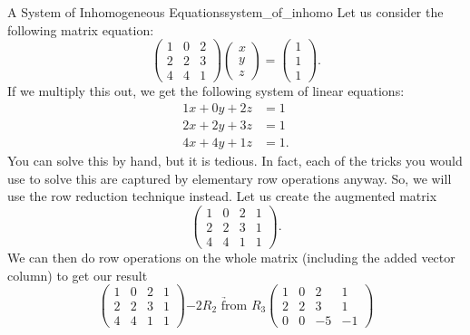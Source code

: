         \begin{ex}{A System of Inhomogeneous Equations}{system_of_inhomo}
        Let us consider the following matrix equation:
        \[
        \begin{pmatrix}
        1 & 0 & 2\\
        2 & 2 & 3\\
        4 & 4 & 1
        \end{pmatrix}
        \begin{pmatrix}
        x\\
        y\\
        z
        \end{pmatrix}
        =\begin{pmatrix}
        1\\
        1\\
        1
        \end{pmatrix}.
        \]
        If we multiply this out, we get the following system of linear equations:
        \begin{align*}
            1x+0y+2z&=1\\
            2x+2y+3z&=1\\
            4x+4y+1z&=1.
        \end{align*}
        You can solve this by hand, but it is tedious. In fact, each of the tricks you would use to solve this are captured by elementary row operations anyway. So, we will use the row reduction technique instead.  Let us create the augmented matrix
        \[
        \left(\begin{array}{ccc|c}
        1 & 0 & 2 & 1 \\
        2 & 2 & 3 & 1 \\
        4 & 4 & 1 & 1
        \end{array}\right).
        \]
        We can then do row operations on the whole matrix (including the added vector column) to get our result
        \[
        \left(\begin{array}{ccc|c}
        1 & 0 & 2 & 1 \\
        2 & 2 & 3 & 1 \\
        4 & 4 & 1 & 1
        \end{array}\right) \underrightarrow{-2 R_2 \textrm{ from } R_3} 
        \left(\begin{array}{ccc|c}
        1 & 0 & 2 & 1 \\
        2 & 2 & 3 & 1 \\
        0 & 0 & -5 & -1
        \end{array}\right)
\]
\end{ex}
